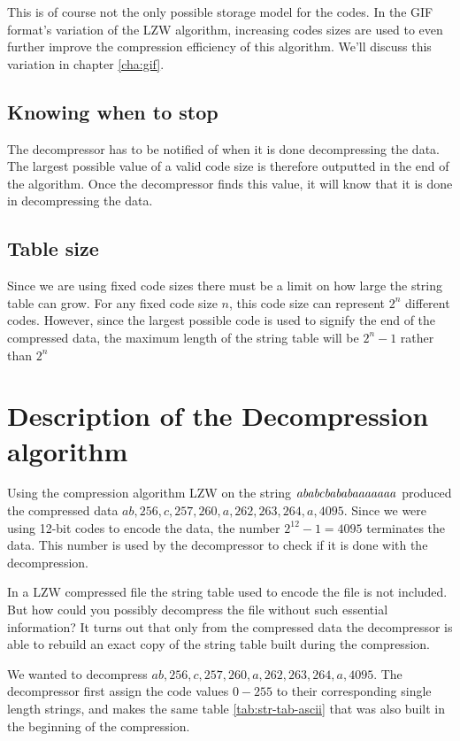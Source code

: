 This is of course not the only possible storage model for the
codes. In the GIF format's variation of the LZW algorithm, increasing
codes sizes are used to even further improve the compression
efficiency of this algorithm. We'll discuss this variation in chapter
\ref{cha:gif}.

\subsection{Knowing when to stop}

The decompressor has to be notified of when it is done decompressing
the data. The largest possible value of a valid code size is therefore
outputted in the end of the algorithm. Once the decompressor finds
this value, it will know that it is done in decompressing the data.

\subsection{Table size}

Since we are using fixed code sizes there must be a limit on how large
the string table can grow. For any fixed code size $n$, this code size
can represent $2^n$ different codes. However, since the largest
possible code is used to signify the end of the compressed data, the
maximum length of the string table will be $2^n - 1$ rather than $2^n$

\section{Description of the Decompression algorithm}

Using the compression algorithm LZW on the string
$\mathit{ababcbababaaaaaaa}$ produced the compressed data $ab, 256,c,
257, 260, a, 262, 263, 264, a,4095$. Since we were using 12-bit codes
to encode the data, the number $2^{12} - 1 = 4095$ terminates the
data. This number is used by the decompressor to check if it is done
with the decompression.

In a LZW compressed file the string table used to encode the file is
not included. But how could you possibly decompress the file without
such essential information? It turns out that only from the compressed
data the decompressor is able to rebuild an exact copy of the string
table built during the compression.

We wanted to decompress $ab, 256,c, 257, 260, a, 262, 263, 264,
a,4095$. The decompressor first assign the code values $0-255$ to
their corresponding single length strings, and makes the same table
\ref{tab:str-tab-ascii} that was also built in the beginning of the
compression.

